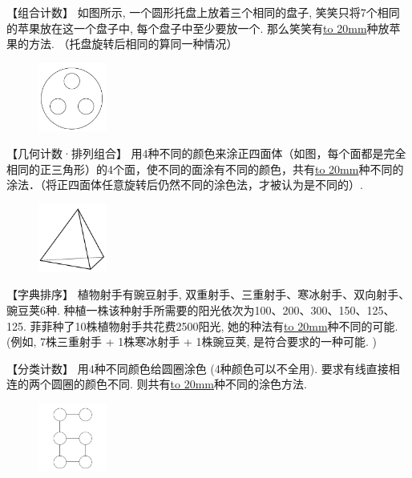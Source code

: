 \item {
    【组合计数】
    如图所示, 一个圆形托盘上放着三个相同的盘子, 笑笑只将7个相同的苹果放在这一个盘子中, 每个盘子中至少要放一个. 那么笑笑有\underline{\hbox to 20mm{}}种放苹果的方法. （托盘旋转后相同的算同一种情况）
    \begin{figure}[H] 
        \centering
        \includegraphics[width=0.2\textwidth]{./pics/Chapter_4/2015_4.png}
    \end{figure}
}

\item {
    【几何计数·排列组合】
    用4种不同的颜色来涂正四面体（如图，每个面都是完全相同的正三角形）的4个面，使不同的面涂有不同的颜色，共有\underline{\hbox to 20mm{}}种不同的涂法．（将正四面体任意旋转后仍然不同的涂色法，才被认为是不同的）.
    \begin{figure}[H] 
        \centering
        \includegraphics[width=0.2\textwidth]{./pics/Chapter_4/2010_1.png}
    \end{figure}
}

\item {
    【字典排序】
    植物射手有豌豆射手, 双重射手、三重射手、寒冰射手、双向射手、豌豆荚6种. 种植一株该种射手所需要的阳光依次为100、200、300、150、125、125. 菲菲种了10株植物射手共花费2500阳光, 她的种法有\underline{\hbox to 20mm{}}种不同的可能.  (例如, 7株三重射手 + 1株寒冰射手 + 1株豌豆荚, 是符合要求的一种可能. )
    \vspace{1cm}
}

\item {
    【分类计数】
    用4种不同颜色给圆圈涂色 (4种颜色可以不全用). 要求有线直接相连的两个圆圈的颜色不同. 则共有\underline{\hbox to 20mm{}}种不同的涂色方法.
    \begin{figure}[H] 
        \centering
        \includegraphics[width=0.2\textwidth]{./pics/Chapter_4/2016_3.png}
    \end{figure}
}

